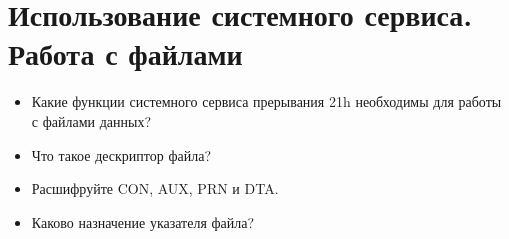 \chapter{Использование системного сервиса. Работа с файлами}
\begin{itemize}
\item Какие функции системного сервиса прерывания 21h необходимы для работы с
файлами данных?
\item Что такое дескриптор файла?
\item Расшифруйте CON, AUX, PRN и DTA.
\item Каково назначение указателя файла?
\end{itemize}
\endinput
